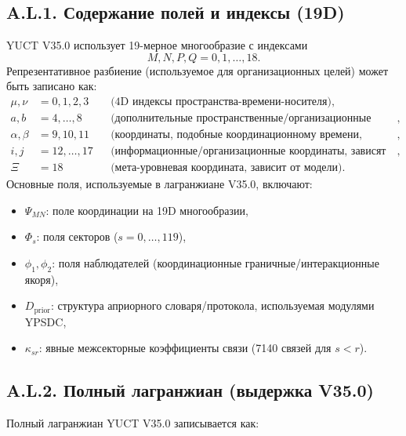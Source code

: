 \documentclass[11pt,a4paper]{article}
\newcommand{\Dprior}{D_{\mathrm{prior}}}
\begin{document}
	\subsection*{A.L.1. Содержание полей и индексы (19D)}
	YUCT V35.0 использует 19-мерное многообразие с индексами
	\[
	M,N,P,Q=0,1,\dots,18.
	\]
	Репрезентативное разбиение (используемое для организационных целей) может быть записано как:
	\begin{align*}
		\mu,\nu &= 0,1,2,3 &&\text{(4D индексы пространства-времени-носителя)},\\
		a,b &= 4,\dots,8 &&\text{(дополнительные пространственные/организационные координаты, зависят от модели)},\\
		\alpha,\beta &= 9,10,11 &&\text{(координаты, подобные координационному времени, зависят от модели)},\\
		i,j &= 12,\dots,17 &&\text{(информационные/организационные координаты, зависят от модели)},\\
		\Xi &= 18 &&\text{(мета-уровневая координата, зависит от модели)}.
	\end{align*}
	Основные поля, используемые в лагранжиане V35.0, включают:
	\begin{itemize}[leftmargin=*]
		\item $\Psi_{MN}$: поле координации на 19D многообразии,
		\item $\Phi_s$: поля секторов ($s=0,\dots,119$),
		\item $\phi_1,\phi_2$: поля наблюдателей (координационные граничные/интеракционные якоря),
		\item $\Dprior$: структура априорного словаря/протокола, используемая модулями YPSDC,
		\item $\kappa_{sr}$: явные межсекторные коэффициенты связи (7140 связей для $s<r$).
	\end{itemize}
	
	\subsection*{A.L.2. Полный лагранжиан (выдержка V35.0)}
	Полный лагранжиан YUCT V35.0 записывается как:
	
\end{document}
